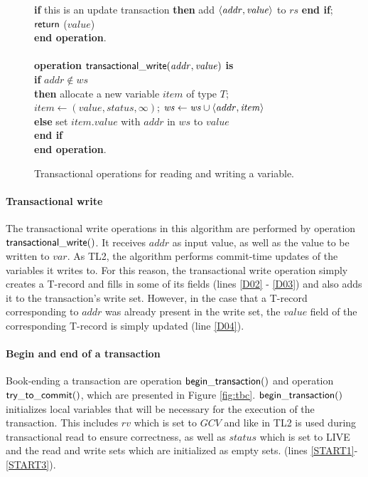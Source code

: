 \documentclass[11pt,letterpaper]{article}
\begin{document}
\begin{figure}
{{\begin{minipage}[t]{150mm}
\begin{tabbing}
 \> {\bf if} this is an update transaction 
                        {\bf then} add $\left \langle \mathit{addr,value} \right \rangle $ to $\mathit{rs}$ {\bf end if}; \\
 \> ${\sf return}$ ($\mathit{value}$) \\
{\bf end operation}. \\
\\
{\bf operation}  ${\sf transactional\_write}(\mathit{addr, value})$ {\bf is}\\
 \> {\bf if} $\mathit{addr} \not\in \mathit{ws}$  \\
 \>\> {\bf then} \> allocate a new variable $item$ of type $T$; \\
 \>\>\> $\mathit{item}  \gets (\mathit{value, status, \infty})$; 
                   $\mathit{ws} \gets \mathit{ws} \cup \left \langle \mathit{addr, item} \right \rangle $ \\
 \>\> {\bf else} \> set $\mathit{item.value}$ with $\mathit{addr}$ in $\mathit{ws}$ to $\mathit{value}$ \\
 \> {\bf end if} \\
{\bf end operation}.
\end{tabbing}
\normalsize
\end{minipage}
}
\caption{Transactional operations for reading and writing a variable.}
\label{fig:tops}
}
\end{figure}

\paragraph{Transactional write}
The transactional write operations in this algorithm are performed by 
operation ${\sf transactional\_write()}$. 
It receives $\mathit{addr}$ as input value, as well as the value 
to be written to $\mathit{var}$. As  TL2, the algorithm 
performs commit-time updates of the variables it writes to. 
For this reason, the transactional write  
operation simply creates a T-record and fills in some of its 
fields (lines \ref{D02} - \ref{D03}) and also 
adds it to the transaction{}'s write set.
However, in the case that a T-record corresponding to $\mathit{addr}$  was
already present in  the write set, the
$\mathit{value}$ field of the corresponding  
T-record is simply updated (line \ref{D04}).


\paragraph{Begin and end of a transaction} 
Book-ending a transaction are operation ${\sf begin\_transaction()}$ 
and operation ${\sf try\_to\_commit()}$, which are 
presented in Figure \ref{fig:tbc}. ${\sf begin\_transaction()}$ 
initializes local variables that will be necessary 
for the execution of the transaction.
This includes $\mathit{rv}$
which is set to $\mathit{GCV}$ and like in TL2 is used during transactional
read to ensure correctness, 
as well as $\mathit{status}$ which is set to LIVE and the read and write sets
which are initialized as empty sets.
(lines \ref{START1}-\ref{START3}). 
\end{document}
